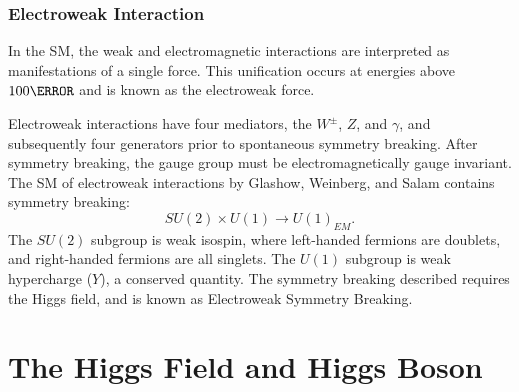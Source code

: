         \subsubsection{Electroweak Interaction} \label{sssec:ew-theory}

        In the \gls{SM}, the weak and electromagnetic interactions are interpreted as manifestations of a single force. This unification occurs at energies above $\unit{100}{\GeV}$ and is known as the electroweak force.

        Electroweak interactions have four mediators, the $W^{\pm}$, $Z$, and $\gamma$, and subsequently four generators prior to spontaneous symmetry breaking. After symmetry breaking, the gauge group must be electromagnetically gauge invariant. The \gls{SM} of electroweak interactions by Glashow, Weinberg, and Salam \cite{Glashow:1959,Weinberg:1967,Salam1959} contains symmetry breaking:
        \begin{equation}
            SU(2) \times U(1) \rightarrow U(1)_{EM}.
        \end{equation}
        The $SU(2)$ subgroup is weak isospin, where left-handed fermions are doublets, and right-handed fermions are all singlets. The $U(1)$ subgroup is weak hypercharge ($Y$), a conserved quantity. The symmetry breaking described requires the Higgs field, and is known as Electroweak Symmetry Breaking.

\section{The Higgs Field and Higgs Boson}

